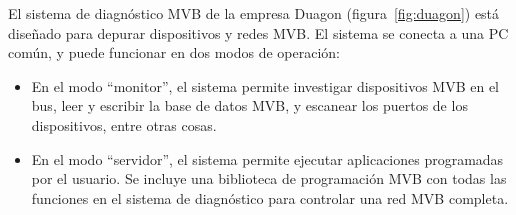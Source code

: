 El sistema de diagnóstico MVB de la empresa Duagon \cite{duagon} (figura~\ref{fig:duagon}) está diseñado para depurar dispositivos y redes MVB. El sistema se conecta a una PC común, y puede funcionar en dos modos de operación:

\begin{itemize}
\item En el modo ``monitor'', el sistema permite investigar dispositivos MVB en el bus, leer y escribir la base de datos MVB, y escanear los puertos de los dispositivos, entre otras cosas.
\item En el modo ``servidor'', el sistema permite ejecutar aplicaciones programadas por el usuario. Se incluye una biblioteca de programación MVB con todas las funciones en el sistema de diagnóstico para controlar una red MVB completa.
\end{itemize}

